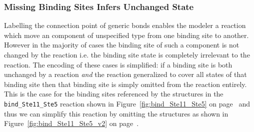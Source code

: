\documentclass{cekarticle}
\begin{document}
\clearpage
\subsubsection{Missing Binding Sites Infers Unchanged State}

Labelling the connection point of generic bonds enables the modeler a reaction which move an
component of unspecified type from one binding site to another.  However in the majority of cases
the binding site of such a component is not changed by the reaction i.e. the binding site state is
completely irrelevant to the reaction.  The encoding of these cases is simplified:  if a binding site
is both unchanged by a reaction \emph{and} the reaction generalized to cover all states of that
binding site then that binding site is simply omitted from the reaction entirely.  This
is the case for the binding sites referenced by the  structures in the
\texttt{bind\_Ste11\_Ste5} reaction shown in Figure~\ref{fig:bind_Ste11_Ste5} on
page~\pageref{fig:bind_Ste11_Ste5} and thus we can
simplify this reaction by omitting the  structures as shown in
Figure~\ref{fig:bind_Ste11_Ste5_v2} on page~\pageref{fig:bind_Ste11_Ste5_v2}.
\end{document}
